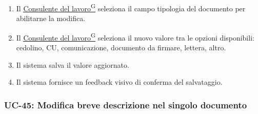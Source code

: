 ﻿\documentclass[a4paper,12pt]{article}
\providecommand{\glslink}[2]{\href{https://alittlebyte-19.github.io/Documentazione/glossario.html\#gls-#1}{\underline{#2}\textsuperscript{\scriptsize G}}}
\begin{document}
\begin{description}[style=multiline, leftmargin=4cm, font=\bfseries]
\begin{enumerate}[leftmargin=*, nosep]
\begin{description}[style=multiline, leftmargin=4cm, font=\bfseries]
    \begin{enumerate}[leftmargin=*, nosep]
        \item Il \glslink{consulente-del-lavoro-cdl}{Consulente del lavoro} seleziona il campo tipologia del documento per abilitarne la modifica.
        \item Il \glslink{consulente-del-lavoro-cdl}{Consulente del lavoro} seleziona il nuovo valore tra le opzioni disponibili: cedolino, CU, comunicazione, documento da firmare, lettera, altro.
        \item Il sistema salva il valore aggiornato.
        \item Il sistema fornisce un feedback visivo di conferma del salvataggio.
    \end{enumerate}
\end{description}

\subsubsection{UC-45: Modifica breve descrizione nel singolo documento}
\mbox{} \\


\end{enumerate}
\end{description}
\end{document}
